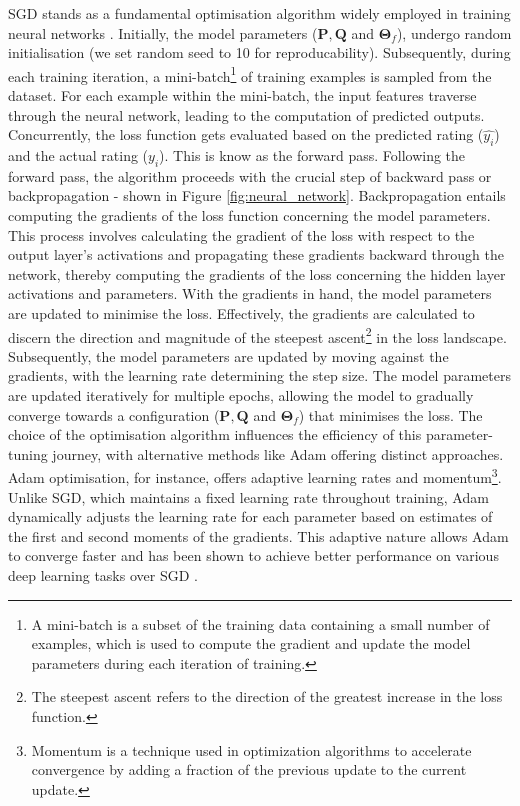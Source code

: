 SGD stands as a fundamental optimisation algorithm widely employed in training neural networks \cite{abdi1999neural}. Initially, the model parameters ($\mathbf{P}, \mathbf{Q}$ and $\boldsymbol{\Theta}_f$), undergo random initialisation (we set random seed to 10 for reproducability). Subsequently, during each training iteration, a mini-batch\footnote{A mini-batch is a subset of the training data containing a small number of examples, which is used to compute the gradient and update the model parameters during each iteration of training.} of training examples is sampled from the dataset. For each example within the mini-batch, the input features traverse through the neural network, leading to the computation of predicted outputs. Concurrently, the loss function gets evaluated based on the predicted rating ($\hat{y_i}$) and the actual rating ($y_i$). This is know as the forward pass. Following the forward pass, the algorithm proceeds with the crucial step of backward pass or backpropagation - shown in Figure \ref{fig:neural_network}. Backpropagation entails computing the gradients of the loss function concerning the model parameters. This process involves calculating the gradient of the loss with respect to the output layer's activations and propagating these gradients backward through the network, thereby computing the gradients of the loss concerning the hidden layer activations and parameters. With the gradients in hand, the model parameters are updated to minimise the loss. Effectively, the gradients are calculated to discern the direction and magnitude of the steepest ascent\footnote{The steepest ascent refers to the direction of the greatest increase in the loss function.} in the loss landscape. Subsequently, the model parameters are updated by moving against the gradients, with the learning rate determining the step size. The model parameters are updated iteratively for multiple epochs, allowing the model to gradually converge towards a configuration ($\mathbf{P}, \mathbf{Q}$ and $\boldsymbol{\Theta}_f$) that minimises the loss. The choice of the optimisation algorithm influences the efficiency of this parameter-tuning journey, with alternative methods like Adam offering distinct approaches. Adam optimisation, for instance, offers adaptive learning rates and momentum\footnote{Momentum is a technique used in optimization algorithms to accelerate convergence by adding a fraction of the previous update to the current update.}. Unlike SGD, which maintains a fixed learning rate throughout training, Adam dynamically adjusts the learning rate for each parameter based on estimates of the first and second moments of the gradients. This adaptive nature allows Adam to converge faster and has been shown to achieve better performance on various deep learning tasks over SGD \cite{zhang2018improved}.

